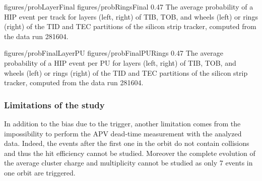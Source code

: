 
                 {figures/probLayerFinal} %
                 {figures/probRingsFinal} %
                 {0.47}       %
                 {The average probability of a HIP event per track for layers (left, right) of TIB, TOB, and wheels (left) or rings (right) of the TID and TEC partitions of the silicon strip tracker, computed from the data run 281604.} 


                 {figures/probFinalLayerPU} %
                 {figures/probFinalPURings} %
                 {0.47}       %
                 {The average probability of a HIP event per PU for layers (left, right) of TIB, TOB, and wheels (left) or rings (right) of the TID and TEC partitions of the silicon strip tracker, computed from the data run 281604.} 

\subsubsection{Limitations of the study}
 
In addition to the bias due to the trigger, another limitation comes from the impossibility to perform the APV dead-time measurement with the analyzed data. Indeed, the events after the first one in the orbit do not contain collisions and thus the hit efficiency cannot be studied. Moreover the complete evolution of the average cluster charge and multiplicity cannot be studied as only 7 events in one orbit are triggered. 


